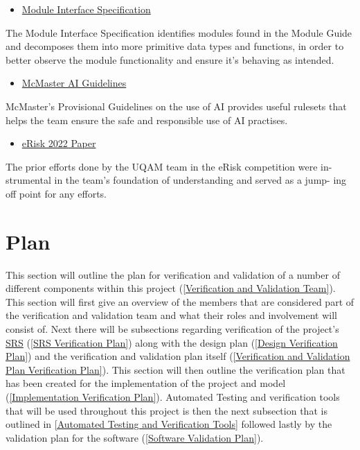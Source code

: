 \documentclass[12pt, titlepage]{article}
\begin{document}
\begin{itemize}
	\item \href{https://github.com/MichaelBreau/nlp-mentalhealth/blob/main/docs/Design/SoftDetailedDes/MIS.pdf}{Module Interface Specification}
\end{itemize}
The Module Interface Specification identifies modules found in the Module
Guide and decomposes them into more primitive data types and functions,
in order to better observe the module functionality and ensure it’s behaving
as intended.

\begin{itemize}
	\item \href{https://mi.mcmaster.ca/generative-artificial-intelligence-in-teaching-and-learning/#tab-content-provisional-guidelines}{McMaster AI Guidelines}
\end{itemize}
McMaster’s Provisional Guidelines on the use of AI provides useful rulesets
that helps the team ensure the safe and responsible use of
AI practises.

\begin{itemize}
	\item \href{https://ceur-ws.org/Vol-3180/paper-74.pdf}{eRisk 2022 Paper}
\end{itemize}
The prior efforts done by the UQAM team in the eRisk competition were in-
strumental in the team’s foundation of understanding and served as a jump-
ing off point for any efforts.
\section{Plan}

This section will outline the plan for verification and validation of a number of different components within this project  (\ref{Verification and Validation Team}). This section will first give an overview of the members that are considered part of the verification and validation team and what their roles and involvement will consist of. Next there will be subsections regarding verification of the project's \href{https://github.com/MichaelBreau/nlp-mentalhealth/blob/main/docs/SRS/index.pdf}{SRS} (\ref{SRS Verification Plan}) along with the design plan (\ref{Design Verification Plan}) and the verification and validation plan itself (\ref{Verification and Validation Plan Verification Plan}). This section will then outline the verification plan that has been created for the implementation of the project and model (\ref{Implementation Verification Plan}). Automated Testing and verification tools that will be used throughout this project is then the next subsection that is outlined in \ref{Automated Testing and Verification Tools} followed lastly by the validation plan for the software (\ref{Software Validation Plan}).
  
\end{document}
